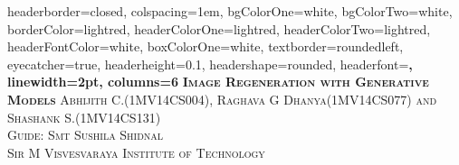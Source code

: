 \documentclass[a3paper,fontscale=.9]{baposter} %
\begin{document}
\begin{poster}
{
headerborder=closed, %
colspacing=1em, %
bgColorOne=white, %
bgColorTwo=white, %
borderColor=lightred, %
headerColorOne=lightred, %
headerColorTwo=lightred, %
headerFontColor=white, %
boxColorOne=white, %
textborder=roundedleft, %
eyecatcher=true, %
headerheight=0.1\textheight, %
headershape=rounded, %
headerfont=\Large\bf\textsc, %
linewidth=2pt, %
columns=6
}
%
{} %
{\bf\textsc{Image Regeneration with Generative Models}} %
{\textsc{ Abhijith C.(1MV14CS004), Raghava G Dhanya(1MV14CS077) and Shashank S.(1MV14CS131)\\Guide: Smt Sushila Shidnal\\ Sir M Visvesvaraya Institute of Technology }} %
{}%




\end{poster}
\end{document}
